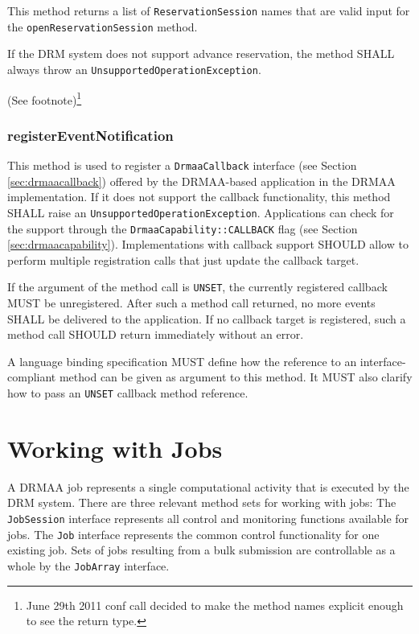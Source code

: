 \documentclass{article}
\newcommand{\h}[1]{\lstinline|#1|}
\newcommand{\langbind}[1]{\begin{shaded}#1\end{shaded}}
\newcommand{\rat}[1]{ {\tiny(See footnote)}\footnote{#1} }
\begin{document}
This method returns a list of \h{ReservationSession} names that are valid input for the \h{openReservationSession} method.

If the DRM system does not support advance reservation, the method SHALL always throw an \h{UnsupportedOperationException}.

\rat{June 29th 2011 conf call decided to make the method names explicit enough to see the return type.}


\subsubsection{registerEventNotification}

This method is used to register a \h{DrmaaCallback} interface (see Section \ref{sec:drmaacallback}) offered by the DRMAA-based application in the DRMAA implementation. If it does not support the callback functionality, this method SHALL raise an \h{UnsupportedOperationException}. Applications can check for the support through the \h{DrmaaCapability::CALLBACK} flag (see Section \ref{sec:drmaacapability}). Implementations with callback support SHOULD allow to perform multiple registration calls that just update the callback target. 

If the argument of the method call is \h{UNSET}, the currently registered callback MUST be unregistered. After such a method call returned, no more events SHALL be delivered to the application. If no callback target is registered, such a method call SHOULD return immediately without an error. 

\langbind{
A language binding specification MUST define how the reference to an interface-compliant method can be given as argument to this method. It MUST also clarify how to pass an \h{UNSET} callback method reference.
}	

\section{Working with Jobs}

A DRMAA job represents a single computational activity that is executed by the DRM system. There are three relevant method sets for working with jobs: The \h{JobSession} interface represents all control and monitoring functions available for jobs. The \h{Job} interface represents the common control functionality for one existing job. Sets of jobs resulting from a bulk submission are controllable as a whole by the \h{JobArray} interface. 
\end{document}

